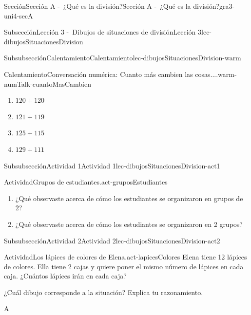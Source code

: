 \documentclass[twoside,10pt,]{article}
\begin{document}
\begin{sectionptx}{Sección}{Sección A -~¿Qué es la división?}{}{Sección A -~¿Qué es la división?}{}{}{gra3-uni4-secA}
\begin{subsectionptx}{Subsección}{Lección 3 -~Dibujos de situaciones de división}{}{Lección 3}{}{}{lec-dibujosSituacionesDivision}
\begin{subsubsectionptx}{Subsubsección}{Calentamiento}{}{Calentamiento}{}{}{lec-dibujosSituacionesDivision-warm}
\begin{exploration}{Calentamiento}{Conversación numérica: Cuanto más cambien las cosas....}{warm-numTalk-cuantoMasCambien}
\par
%
\begin{enumerate}[label={\Alph*.}]
\item{}\(\displaystyle 120 + 120\)%
\item{}\(\displaystyle 121 + 119\)%
\item{}\(\displaystyle 125 + 115\)%
\item{}\(\displaystyle 129 + 111\)%
\end{enumerate}
%
\end{exploration}%
\end{subsubsectionptx}
%
%
\typeout{************************************************}
\typeout{************************************************}
%
\begin{subsubsectionptx}{Subsubsección}{Actividad 1}{}{Actividad 1}{}{}{lec-dibujosSituacionesDivision-act1}
\begin{activity}{Actividad}{Grupos de estudiantes.}{act-gruposEstudiantes}%
%
\begin{enumerate}
\item{}¿Qué observaste acerca de cómo los estudiantes se organizaron en grupos de 2?%
\item{}¿Qué observaste acerca de cómo los estudiantes se organizaron en 2 grupos?%
\end{enumerate}
%
\end{activity}%
\end{subsubsectionptx}
%
%
\typeout{************************************************}
\typeout{************************************************}
%
\begin{subsubsectionptx}{Subsubsección}{Actividad 2}{}{Actividad 2}{}{}{lec-dibujosSituacionesDivision-act2}
\begin{activity}{Actividad}{Los lápices de colores de Elena.}{act-lapicesColores}%
Elena tiene 12 lápices de colores. Ella tiene 2 cajas y quiere poner el mismo número de lápices en cada caja. ¿Cuántos lápices irán en cada caja?%
\par
¿Cuál dibujo corresponde a la situación? Explica tu razonamiento.%
\begin{sidebyside}{2}{0}{0}{0}%
\begin{sbspanel}{0.5}%
A%
\par

\end{sbspanel}
\end{sidebyside}
\end{activity}
\end{subsubsectionptx}
\end{subsectionptx}
\end{sectionptx}
\end{document}
